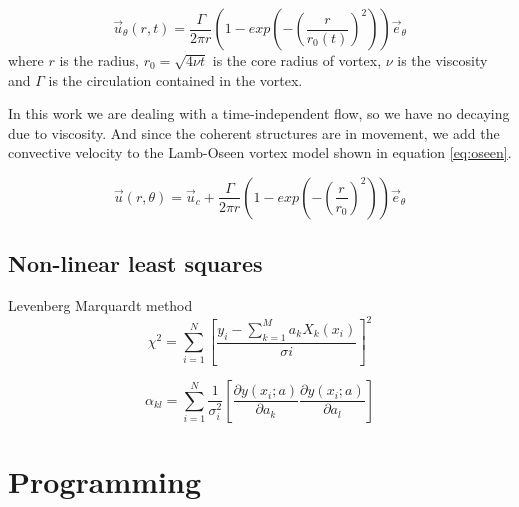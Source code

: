 \documentclass[12pt, a4paper, openany]{memoir}
\begin{document}
\begin{equation}
\label{eq:oseenDecay}
\vec{u}_\theta(r,t) = \frac{\Gamma}{2\pi r} \left( 1 - exp \left( -\left(\frac{r}{r_0(t)}\right)^2\right)\right) \vec{e}_{\theta}
\end{equation}
where $r$ is the radius, $r_0 = \sqrt{4 \nu t}$ is the core radius of vortex, $\nu$ is the viscosity and $\Gamma$ is the circulation contained in the vortex. 

In this work we are dealing with a time-independent flow, so we have no decaying due to viscosity. And since the coherent structures are in movement, we add the convective velocity to the Lamb-Oseen vortex model shown in equation \ref{eq:oseen}.  

\begin{equation}
\label{eq:oseen}
\vec{u}(r,\theta) = \vec{u}_c + \frac{\Gamma}{2\pi r} \left( 1 - exp \left( -\left(\frac{r}{r_0}\right)^2\right)\right) \vec{e}_{\theta}
\end{equation}

\subsection{Non-linear least squares}

Levenberg Marquardt method
\begin{equation}
\chi^2 = \sum_{i=1}^N \left[ \frac{y_i - \sum_{k=1}^M a_k X_k (x_i)}{\sigma i} \right]^2
\end{equation}

\begin{equation}
\alpha_{kl} = \sum_{i=1}^N \frac{1}{\sigma_i^2} \left[ \frac{\partial y(x_i;a)}{\partial a_k} \frac{\partial y(x_i;a)}{\partial a_l} \right]
\end{equation}

\section{Programming}
\end{document}
